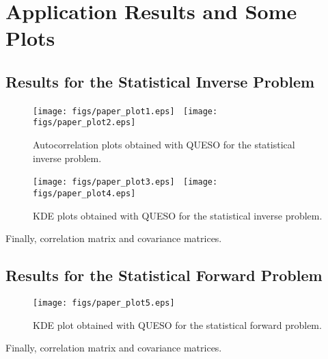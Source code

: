 \section{Application Results and Some Plots}

\subsection{Results for the Statistical Inverse Problem}

\begin{figure}[h!]
\centerline{
\texttt{[image: figs/paper\_plot1.eps]}
$~$
\texttt{[image: figs/paper\_plot2.eps]}
}
\caption{
Autocorrelation plots obtained with QUESO for the statistical inverse problem.
}
\label{fig-sip-autocorr-plots}
\end{figure}

\begin{figure}[h!]
\centerline{
\texttt{[image: figs/paper\_plot3.eps]}
$~$
\texttt{[image: figs/paper\_plot4.eps]}
}
\caption{
KDE plots obtained with QUESO for the statistical inverse problem.
}
\label{fig-sip-hist-kde-plots}
\end{figure}

Finally, correlation matrix and covariance matrices.

\clearpage

\subsection{Results for the Statistical Forward Problem}

\begin{figure}[h!]
\centerline{
\texttt{[image: figs/paper\_plot5.eps]}
}
\caption{
KDE plot obtained with QUESO for the statistical forward problem.
}
\label{fig-sfp-hist-kde-plots}
\end{figure}

Finally, correlation matrix and covariance matrices.

